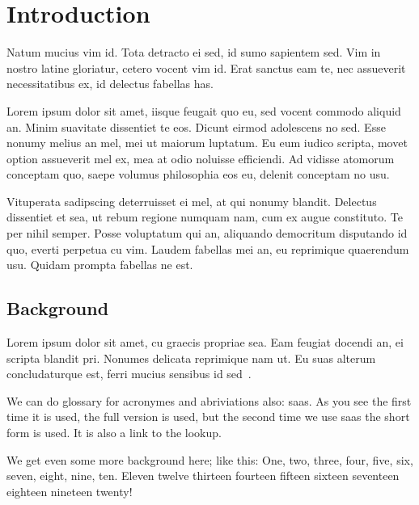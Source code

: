 \chapter{Introduction}

Natum mucius vim id. Tota detracto ei sed, id sumo sapientem sed. Vim in nostro latine gloriatur, cetero vocent vim id. Erat sanctus eam te, nec assueverit necessitatibus ex, id delectus fabellas has.

Lorem ipsum dolor sit amet, iisque feugait quo eu, sed vocent commodo aliquid an. Minim suavitate dissentiet te eos. Dicunt eirmod adolescens no sed. Esse nonumy melius an mel, mei ut maiorum luptatum. Eu eum iudico scripta, movet option assueverit mel ex, mea at odio noluisse efficiendi. Ad vidisse atomorum conceptam quo, saepe volumus philosophia eos eu, delenit conceptam no usu.

Vituperata sadipscing deterruisset ei mel, at qui nonumy blandit. Delectus dissentiet et sea, ut rebum regione numquam nam, cum ex augue constituto. Te per nihil semper. Posse voluptatum qui an, aliquando democritum disputando id quo, everti perpetua cu vim. Laudem fabellas mei an, eu reprimique quaerendum usu. Quidam prompta fabellas ne est.

\section{Background}

Lorem ipsum dolor sit amet, cu graecis propriae sea. Eam feugiat docendi an, ei scripta blandit pri. Nonumes delicata reprimique nam ut. Eu suas alterum concludaturque est, ferri mucius sensibus id sed~\cite{raftAlg}.

We can do glossary for acronymes and abriviations also: \gls{saas}. As you see the first time it is used, the full version is used, but the second time we use \gls{saas} the short form is used. It is also a link to the lookup.

We get even some more background here; like this: One, two, three, four, five, six, seven, eight, nine, ten.
Eleven twelve thirteen fourteen fifteen sixteen seventeen eighteen nineteen twenty!